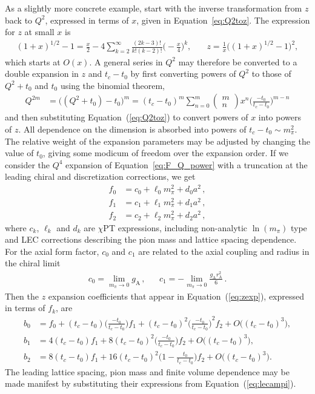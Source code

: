 \documentclass{ar-1col}
\newcommand{\tctza}{\ensuremath{(t_c-t_0)}}
\newcommand{\tctzb}{\ensuremath{\Big(\frac{-t_0}{t_c-t_0}\Big)}}
\begin{document}
As a slightly more concrete example, start with the inverse transformation from $z$ back to $Q^2$, expressed in terms of $x$, given in Equation~\eqref{eq:Q2toz}.  The expression for $z$ at small $x$ is \begin{align}
 (1+x)^{1/2} -1 = \frac{x}{2}
 -4\sum_{k=2}^\infty \frac{(2k-3)!}{k!(k-2)!} \biggr( -\frac{x}{4} \biggr)^{k},
 &\quad
 z = \frac{1}{x} \big( (1+x)^{1/2} -1 \big)^2,
 \label{eq:ztoQ2}
\end{align}
 which starts at $O(x)$.
A general series in $Q^2$ may therefore be converted to a double expansion in $z$ and $t_c-t_0$
 by first converting powers of $Q^2$ to those of $Q^2+t_0$ and $t_0$ using the  binomial theorem,
\begin{align}
 Q^{2m} &= \big( (Q^2+t_0) -t_0 \big)^m
 = (t_c-t_0)^m
 \sum_{n=0}^{m} \left( \begin{array}{c} m \\ n \end{array} \right)
 x^n
 \biggr( \frac{-t_0}{t_c-t_0} \biggr)^{m-n}
\end{align}
and then substituting Equation~(\ref{eq:Q2toz}) to convert powers of
 $x$ into powers of $z$.
All dependence on the dimension is absorbed into powers of
 $t_c-t_0 \sim m_\pi^2$.
The relative weight of the expansion parameters may be adjusted by changing the value of $t_0$, giving some modicum of freedom over the expansion order.
If we consider the $Q^4$ expansion of Equation~\eqref{eq:F_Q_power} with
 a truncation at the leading chiral and discretization corrections, we get
\begin{align}
f_0 &= c_0 + \ell_0 m_\pi^2 + d_0 a^2\, ,
\nonumber\\
f_1 &= c_1 + \ell_1 m_\pi^2 + d_1 a^2\, ,
\nonumber\\
f_2 &= c_2 + \ell_2 m_\pi^2 + d_2 a^2\, ,
\label{eq:lecampi}
\end{align}
 where $c_k$, $\ell_k$ and $d_k$ are $\chi$PT expressions, including non-analytic $\ln(m_\pi)$ type and LEC corrections describing the pion mass and lattice spacing dependence.
For the axial form factor, $c_0$ and $c_1$ are related to the axial coupling and radius in the chiral limit
\begin{align}
&c_0 = \lim_{m_\pi\rightarrow0} g_{\mathrm{A}}\, ,&
&c_1 = -\lim_{m_\pi\rightarrow0} \frac{g_{\mathrm{A}} r_{\mathrm{A}}^2}{6}\, .&
\end{align}
Then the $z$ expansion coefficients that appear in Equation~(\ref{eq:zexp}),
 expressed in terms of $f_k$, are
\begin{align}\label{eq:z_coeff_xpt}
b_0 &= f_0 +\tctza \tctzb f_1 +\tctza^2 \tctzb^2 f_2 +O\big(\tctza^3\big),
\nonumber\\
b_1 &= 4 \tctza f_1 +8 \tctza^2 \tctzb f_2 +O\big(\tctza^3\big),
\nonumber\\
b_2 &= 8 \tctza f_1 +16 \tctza^2 \Big(1 -\frac{t_0}{t_c-t_0}\Big) f_2 +O\big(\tctza^3\big).
\end{align}
The leading lattice spacing, pion mass and finite volume dependence may be made manifest by substituting their expressions from Equation~(\ref{eq:lecampi}).
\end{document}
